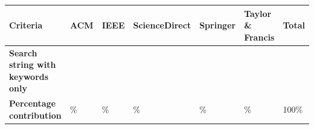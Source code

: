 \begin{table}
	{\begin{tabular}{p{3.0cm}p{1.0cm}p{1.0cm}p{2.0cm}p{1.5cm}p{2.5cm}p{1.0cm}} \toprule
			\textbf{Criteria}                         & \textbf{ACM} & \textbf{IEEE} & \textbf{ScienceDirect} & \textbf{Springer} & \textbf{Taylor \& Francis} & \textbf{Total} \\
			\midrule
			\textbf{Search string with keywords only} & \iacm{}      & \iieee{}      & \isd{}                 & \ispr{}           & \itf{}                     & \itot{}        \\
			\textbf{Percentage contribution}          & \iacmp{}\%   & \iieeep{}\%   & \isdp{}\%              & \isprp{}\%        & \itfp{}\%                  & 100\%          \\
			\bottomrule
		\end{tabular}}
	\label{table:search_results_exclusion}
\end{table}

